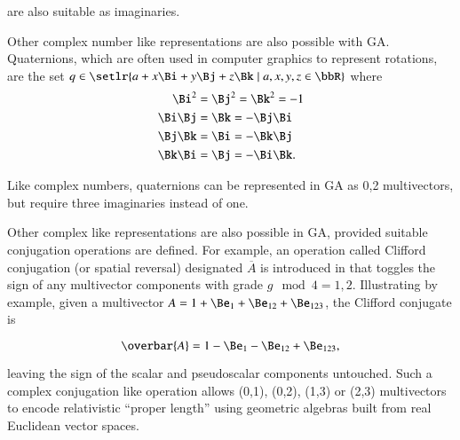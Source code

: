 are also suitable as imaginaries.

Other complex number like representations are also possible with GA.  Quaternions, which are often used in computer graphics to represent rotations,
are the set \( q \in \setlr{ a + x \Bi + y \Bj + z \Bk \mid a, x, y, z \in \bbR} \) where
\begin{equation}\label{eqn:2dMultiplication:240}
\begin{aligned}
\Bi^2 &= \Bj^2 = \Bk^2 = -1 \\
\Bi \Bj &= \Bk = -\Bj \Bi \\
\Bj \Bk &= \Bi = -\Bk \Bj \\
\Bk \Bi &= \Bj = -\Bi \Bk.
\end{aligned}
\end{equation}

Like complex numbers, quaternions can be represented in GA as 0,2 multivectors, but require three imaginaries instead of one.

Other complex like representations are also possible in GA, provided suitable conjugation operations are defined.  For example,
an operation called Clifford conjugation (or spatial reversal) designated \( \overbar{A} \) is introduced in \citep{baylis2004electrodynamics}
that toggles the sign of any multivector components with grade \( g \mod 4 = 1,2 \).  Illustrating by example, given a multivector
\( A = 1 + \Be_1 + \Be_{12} + \Be_{123} \), the Clifford conjugate is

\begin{dmath}\label{eqn:galiterature:60}
\overbar{A} = 1 - \Be_1 - \Be_{12} + \Be_{123},
\end{dmath}

leaving the sign of the scalar and pseudoscalar components untouched.  Such a complex conjugation like operation allows (0,1), (0,2), (1,3) or (2,3) multivectors to encode relativistic ``proper length'' using geometric algebras built from real Euclidean vector spaces.

